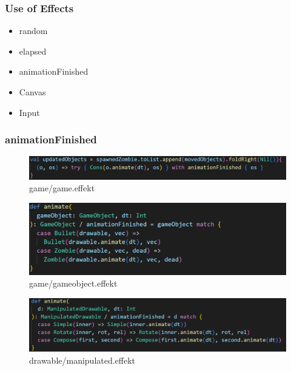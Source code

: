\documentclass{beamer}
\begin{document}
	\begin{frame}
		\frametitle{Use of Effects}
		\begin{Large}
		\begin{itemize}
			\setlength{\itemsep}{1em}
			\item random
			\item elapsed
			\item animationFinished
			\item Canvas
			\item Input
		\end{itemize}
		\end{Large}
	\end{frame}

	\begin{frame}
		\frametitle{animationFinished}
		\begin{figure}
			\includegraphics[width=.75\linewidth]{images/animate1.png}
			\caption{game/game.effekt}
		\end{figure}
		\begin{figure}
			\includegraphics[width=.75\linewidth]{images/animate2.png}
			\caption{game/gameobject.effekt}
		\end{figure}
		\begin{figure}
			\includegraphics[width=.75\linewidth]{images/animate3.png}
			\caption{drawable/manipulated.effekt}
		\end{figure}
	\end{frame}
	
\end{document}

